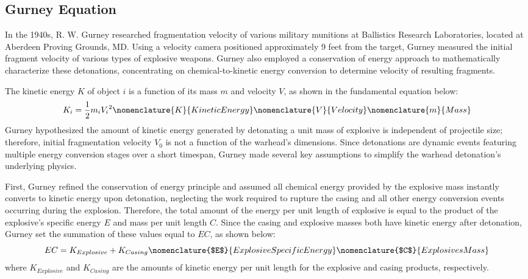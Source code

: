 

\subsection{Gurney Equation} \label{sec:2_Gurney}
In the 1940s, R. W. Gurney researched fragmentation velocity of various military munitions at Ballistics Research Laboratories, located at Aberdeen Proving Grounds, MD.
Using a velocity camera positioned approximately 9 feet from the target, Gurney measured the initial fragment velocity of various types of explosive weapons. Gurney also employed a conservation of energy approach to mathematically characterize these detonations, concentrating on chemical-to-kinetic energy conversion to determine velocity of resulting fragments.

The kinetic energy $K$ of object $i$ is a function of its mass $m$ and velocity $V$, as shown in the fundamental equation below:
\begin{equation}
K_{i} = \frac{1}{2}m_{i}{V_{i}}^2
\label{eq:2_KE}
\nomenclature{K}{Kinetic Energy}
\nomenclature{V}{Velocity}
\nomenclature{m}{Mass}
\end{equation}
%
Gurney hypothesized the amount of kinetic energy generated by detonating a unit mass of explosive is independent of projectile size; therefore, initial fragmentation velocity $V_0$ is not a function of the warhead's dimensions. Since detonations are dynamic events featuring multiple energy conversion stages over a short timespan, Gurney made several key assumptions to simplify the warhead detonation's underlying physics.

First, Gurney refined the conservation of energy principle and assumed all chemical energy provided by the explosive mass instantly converts to kinetic energy upon detonation, neglecting the work required to rupture the casing and all other energy conversion events occurring during the explosion. Therefore, the total amount of the energy per unit length of explosive is equal to the product of the explosive's specific energy $E$ and mass per unit length $C$. Since the casing and explosive masses both have kinetic energy after detonation, Gurney set the summation of these values equal to $EC$, as shown below: 
\begin{equation}
EC = K_{Explosive} + K_{Casing}
\nomenclature{$E$}{Explosive Specific Energy}
\nomenclature{$C$}{Explosives Mass}
\label{eq:2_Overall_EC}
\end{equation}
%
where $K_{Explosive}$ and $K_{Casing}$ are the amounts of kinetic energy per unit length for the explosive and casing products, respectively. 

